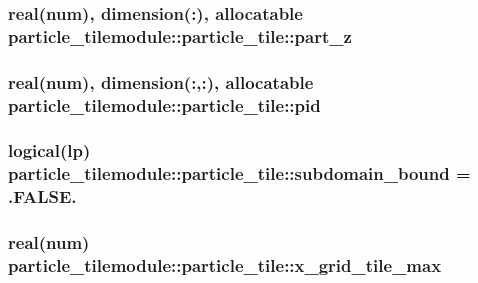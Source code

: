\subsubsection[{\texorpdfstring{part\+\_\+z}{part_z}}]{\setlength{\rightskip}{0pt plus 5cm}real(num), dimension(\+:), allocatable particle\+\_\+tilemodule\+::particle\+\_\+tile\+::part\+\_\+z}\hypertarget{structparticle__tilemodule_1_1particle__tile_a8d89102d9a0d26ea7b4f201737bb6096}{}\label{structparticle__tilemodule_1_1particle__tile_a8d89102d9a0d26ea7b4f201737bb6096}
\subsubsection[{\texorpdfstring{pid}{pid}}]{\setlength{\rightskip}{0pt plus 5cm}real(num), dimension(\+:,\+:), allocatable particle\+\_\+tilemodule\+::particle\+\_\+tile\+::pid}\hypertarget{structparticle__tilemodule_1_1particle__tile_a6237c34ee3dedb0b664c5bc174ddc7e8}{}\label{structparticle__tilemodule_1_1particle__tile_a6237c34ee3dedb0b664c5bc174ddc7e8}
\subsubsection[{\texorpdfstring{subdomain\+\_\+bound}{subdomain_bound}}]{\setlength{\rightskip}{0pt plus 5cm}logical(lp) particle\+\_\+tilemodule\+::particle\+\_\+tile\+::subdomain\+\_\+bound = .F\+A\+L\+S\+E.}\hypertarget{structparticle__tilemodule_1_1particle__tile_a230aae5dde9dba28ac64fe9097349655}{}\label{structparticle__tilemodule_1_1particle__tile_a230aae5dde9dba28ac64fe9097349655}
\subsubsection[{\texorpdfstring{x\+\_\+grid\+\_\+tile\+\_\+max}{x_grid_tile_max}}]{\setlength{\rightskip}{0pt plus 5cm}real(num) particle\+\_\+tilemodule\+::particle\+\_\+tile\+::x\+\_\+grid\+\_\+tile\+\_\+max}\hypertarget{structparticle__tilemodule_1_1particle__tile_afa71688c8ff9a3c496122a637a222a18}{}\label{structparticle__tilemodule_1_1particle__tile_afa71688c8ff9a3c496122a637a222a18}
